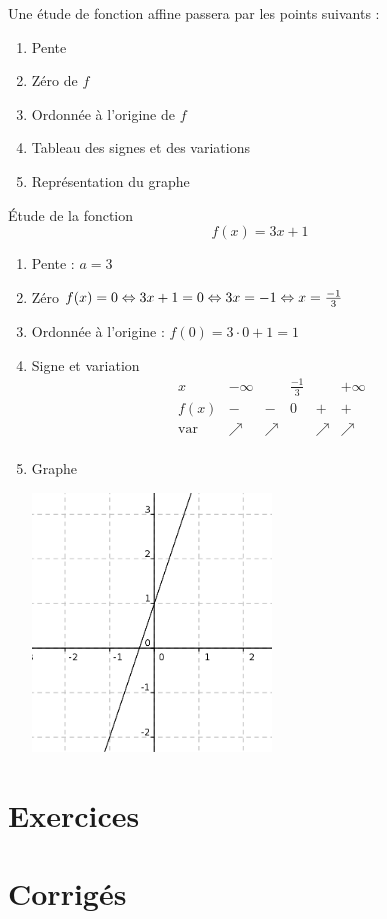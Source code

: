 Une étude de fonction affine passera par les points suivants :
\begin{enumerate}
\item Pente
\item Zéro de $f$
\item Ordonnée à l'origine de $f$
\item Tableau des signes et des variations
\item Représentation du graphe
\end{enumerate}

\begin{exemple}
\'Etude de la fonction 
$$
f(x) = 3x+1
$$
\begin{enumerate}
\item Pente : $a=3$
\item Zéro $f(x) = 0 \Leftrightarrow 3x+1 = 0 \Leftrightarrow 3x = -1 \Leftrightarrow x = \frac{-1}{3}$
\item Ordonnée à l'origine : $f(0) = 3\cdot0 + 1 = 1$
\item Signe et variation
$$
\begin{array}{c|ccccc}
x & -\infty & & \frac{-1}{3} & & +\infty\\
\hline
f(x) &-& - & 0 & + & +\\
\hline
\mbox{var} &\nearrow & \nearrow & & \nearrow & \nearrow\\
\end{array}
$$
\item Graphe
\begin{center}
\includegraphics[width=0.5\textwidth]{affines/ensemble.png}
\end{center}
\end{enumerate}
\end{exemple}
\section{Exercices}

\section{Corrigés}

